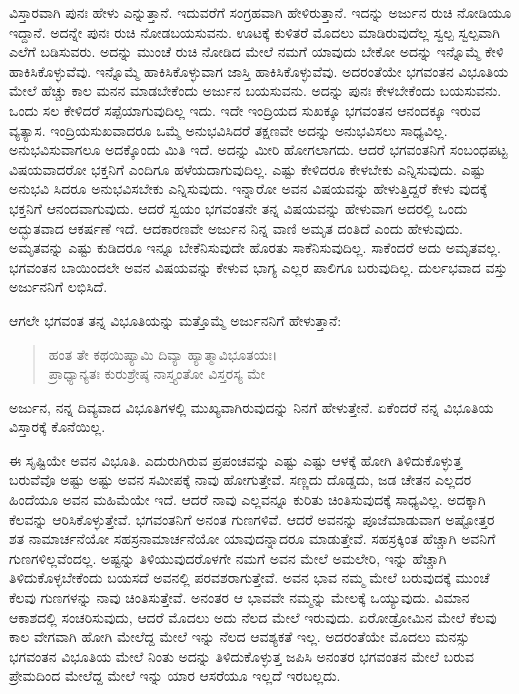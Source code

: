 ವಿಸ್ತಾರವಾಗಿ ಪುನಃ ಹೇಳು ಎನ್ನುತ್ತಾನೆ. ಇದುವರೆಗೆ ಸಂಗ್ರಹವಾಗಿ ಹೇಳಿರುತ್ತಾನೆ. ಇದನ್ನು ಅರ್ಜುನ ರುಚಿ ನೋಡಿಯೂ ಇದ್ದಾನೆ. ಅದನ್ನೇ ಪುನಃ ರುಚಿ ನೋಡಬಯಸುವನು. ಊಟಕ್ಕೆ ಕುಳಿತರೆ ಮೊದಲು ಮಾಡಿರುವುದೆಲ್ಲ ಸ್ವಲ್ಪ ಸ್ವಲ್ಪವಾಗಿ ಎಲೆಗೆ ಬಡಿಸುವರು. ಅದನ್ನು ಮುಂಚೆ ರುಚಿ ನೋಡಿದ ಮೇಲೆ ನಮಗೆ ಯಾವುದು ಬೇಕೋ ಅದನ್ನು ಇನ್ನೊಮ್ಮೆ ಕೇಳಿ ಹಾಕಿಸಿಕೊಳ್ಳುವೆವು. ಇನ್ನೊಮ್ಮೆ ಹಾಕಿಸಿಕೊಳ್ಳುವಾಗ ಜಾಸ್ತಿ ಹಾಕಿಸಿಕೊಳ್ಳುವೆವು. ಅದರಂತೆಯೇ ಭಗವಂತನ ವಿಭೂತಿಯ ಮೇಲೆ ಹೆಚ್ಚು ಕಾಲ ಮನನ ಮಾಡಬೇಕೆಂದು ಅರ್ಜುನ ಬಯಸುವನು. ಅದನ್ನು ಪುನಃ ಕೇಳಬೇಕೆಂದು ಬಯಸುವನು. ಒಂದು ಸಲ ಕೇಳಿದರೆ ಸಪ್ಪೆಯಾಗುವುದಿಲ್ಲ ಇದು. ಇದೇ ಇಂದ್ರಿಯದ ಸುಖಕ್ಕೂ ಭಗವಂತನ ಆನಂದಕ್ಕೂ ಇರುವ ವ್ಯತ್ಯಾಸ. ಇಂದ್ರಿಯಸುಖವಾದರೂ ಒಮ್ಮೆ ಅನುಭವಿಸಿದರೆ ತಕ್ಷಣವೇ ಅದನ್ನು ಅನುಭವಿಸಲು ಸಾಧ್ಯವಿಲ್ಲ. ಅನುಭವಿಸುವಾಗಲೂ ಅದಕ್ಕೊಂದು ಮಿತಿ ಇದೆ. ಅದನ್ನು ಮೀರಿ ಹೋಗಲಾಗದು. ಆದರೆ ಭಗವಂತನಿಗೆ ಸಂಬಂಧಪಟ್ಟ ವಿಷಯವಾದರೋ ಭಕ್ತನಿಗೆ ಎಂದಿಗೂ ಹಳೆಯದಾಗುವುದಿಲ್ಲ. ಎಷ್ಟು ಕೇಳಿದರೂ ಕೇಳಬೇಕು ಎನ್ನಿಸುವುದು. ಎಷ್ಟು ಅನುಭವಿ ಸಿದರೂ ಅನುಭವಿಸಬೇಕು ಎನ್ನಿಸುವುದು. ಇನ್ನಾರೋ ಅವನ ವಿಷಯವನ್ನು ಹೇಳುತ್ತಿದ್ದರೆ ಕೇಳು ವುದಕ್ಕೆ ಭಕ್ತನಿಗೆ ಆನಂದವಾಗುವುದು. ಆದರೆ ಸ್ವಯಂ ಭಗವಂತನೇ ತನ್ನ ವಿಷಯವನ್ನು ಹೇಳುವಾಗ ಅದರಲ್ಲಿ ಒಂದು ಅದ್ಭುತವಾದ ಆಕರ್ಷಣೆ ಇದೆ. ಆದಕಾರಣವೇ ಅರ್ಜುನ ನಿನ್ನ ವಾಣಿ ಅಮೃತ ದಂತಿದೆ ಎಂದು ಹೇಳುವುದು. ಅಮೃತವನ್ನು ಎಷ್ಟು ಕುಡಿದರೂ ಇನ್ನೂ ಬೇಕೆನಿಸುವುದೇ ಹೊರತು ಸಾಕೆನಿಸುವುದಿಲ್ಲ. ಸಾಕೆಂದರೆ ಅದು ಅಮೃತವಲ್ಲ. ಭಗವಂತನ ಬಾಯಿಂದಲೇ ಅವನ ವಿಷಯವನ್ನು ಕೇಳುವ ಭಾಗ್ಯ ಎಲ್ಲರ ಪಾಲಿಗೂ ಬರುವುದಿಲ್ಲ. ದುರ್ಲಭವಾದ ವಸ್ತು ಅರ್ಜುನನಿಗೆ ಲಭಿಸಿದೆ.

ಆಗಲೇ ಭಗವಂತ ತನ್ನ ವಿಭೂತಿಯನ್ನು ಮತ್ತೊಮ್ಮೆ ಅರ್ಜುನನಿಗೆ ಹೇಳುತ್ತಾನೆ:

\begin{verse}
ಹಂತ ತೇ ಕಥಯಿಷ್ಯಾಮಿ ದಿವ್ಯಾ ಹ್ಯಾತ್ಮಾವಿಭೂತಯಃ।\\ಪ್ರಾಧ್ಯಾನ್ಯತಃ ಕುರುಶ್ರೇಷ್ಠ ನಾಸ್ತ್ಯಂತೋ ವಿಸ್ತರಸ್ಯ ಮೇ 
\end{verse}

{\small ಅರ್ಜುನ, ನನ್ನ ದಿವ್ಯವಾದ ವಿಭೂತಿಗಳಲ್ಲಿ ಮುಖ್ಯವಾಗಿರುವುದನ್ನು ನಿನಗೆ ಹೇಳುತ್ತೇನೆ. ಏಕೆಂದರೆ ನನ್ನ ವಿಭೂತಿಯ ವಿಸ್ತಾರಕ್ಕೆ ಕೊನೆಯಿಲ್ಲ.}

ಈ ಸೃಷ್ಟಿಯೇ ಅವನ ವಿಭೂತಿ. ಎದುರುಗಿರುವ ಪ್ರಪಂಚವನ್ನು ಎಷ್ಟು ಎಷ್ಟು ಆಳಕ್ಕೆ ಹೋಗಿ ತಿಳಿದುಕೊಳ್ಳುತ್ತ ಬರುವೆವೊ ಅಷ್ಟು ಅಷ್ಟು ಅವನ ಸಮೀಪಕ್ಕೆ ನಾವು ಹೋಗುತ್ತೇವೆ. ಸಣ್ಣದು ದೊಡ್ಡದು, ಜಡ ಚೇತನ ಎಲ್ಲದರ ಹಿಂದೆಯೂ ಅವನ ಮಹಿಮೆಯೇ ಇದೆ. ಆದರೆ ನಾವು ಎಲ್ಲವನ್ನೂ ಕುರಿತು ಚಿಂತಿಸುವುದಕ್ಕೆ ಸಾಧ್ಯವಿಲ್ಲ. ಅದಕ್ಕಾಗಿ ಕೆಲವನ್ನು ಆರಿಸಿಕೊಳ್ಳುತ್ತೇವೆ. ಭಗವಂತನಿಗೆ ಅನಂತ ಗುಣಗಳಿವೆ. ಆದರೆ ಅವನನ್ನು ಪೂಜೆಮಾಡುವಾಗ ಅಷ್ಟೋತ್ತರ ಶತ ನಾಮಾರ್ಚನೆಯೋ ಸಹಸ್ರನಾಮಾರ್ಚನೆಯೋ ಯಾವುದನ್ನಾದರೂ ಮಾಡುತ್ತೇವೆ. ಸಹಸ್ರಕ್ಕಿಂತ ಹೆಚ್ಚಾಗಿ ಅವನಿಗೆ ಗುಣಗಳಿಲ್ಲವೆಂದಲ್ಲ. ಅಷ್ಟನ್ನು ತಿಳಿಯುವುದರೊಳಗೇ ನಮಗೆ ಅವನ ಮೇಲೆ ಅಮಲೇರಿ, ಇನ್ನು ಹೆಚ್ಚಾಗಿ ತಿಳಿದುಕೊಳ್ಳಬೇಕೆಂದು ಬಯಸದೆ ಅವನಲ್ಲಿ ಪರವಶರಾಗುತ್ತೇವೆ. ಅವನ ಭಾವ ನಮ್ಮ ಮೇಲೆ ಬರುವುದಕ್ಕೆ ಮುಂಚೆ ಕೆಲವು ಗುಣಗಳನ್ನು ನಾವು ಚಿಂತಿಸುತ್ತೇವೆ. ಅನಂತರ ಆ ಭಾವವೇ ನಮ್ಮನ್ನು ಮೇಲಕ್ಕೆ ಒಯ್ಯುವುದು. ವಿಮಾನ ಆಕಾಶದಲ್ಲಿ ಸಂಚರಿಸುವುದು, ಆದರೆ ಮೊದಲು ಅದು ನೆಲದ ಮೇಲೆ ಇರುವುದು. ಏರೋಡ್ರೋಮಿನ ಮೇಲೆ ಕೆಲವು ಕಾಲ ವೇಗವಾಗಿ ಹೋಗಿ ಮೇಲೆದ್ದ ಮೇಲೆ ಇನ್ನು ನೆಲದ ಆವಶ್ಯಕತೆ ಇಲ್ಲ. ಅದರಂತೆಯೇ ಮೊದಲು ಮನಸ್ಸು ಭಗವಂತನ ವಿಭೂತಿಯ ಮೇಲೆ ನಿಂತು ಅದನ್ನು ತಿಳಿದುಕೊಳ್ಳುತ್ತ ಜಪಿಸಿ ಅನಂತರ ಭಗವಂತನ ಮೇಲೆ ಬರುವ ಪ್ರೇಮದಿಂದ ಮೇಲೆದ್ದ ಮೇಲೆ ಇನ್ನು ಯಾರ ಆಸರೆಯೂ ಇಲ್ಲದೆ ಇರಬಲ್ಲದು.

